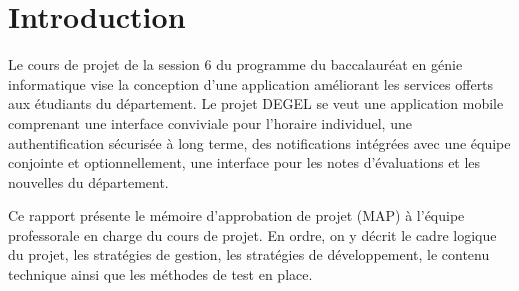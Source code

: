 \section{Introduction}
Le cours de projet de la session 6 du programme du baccalauréat en génie informatique vise la conception d'une application améliorant les services offerts aux étudiants du département. Le projet DEGEL se veut une application mobile comprenant une interface conviviale pour l'horaire individuel, une authentification sécurisée à long terme, des notifications intégrées avec une équipe conjointe et optionnellement, une interface pour les notes d'évaluations et les nouvelles du département.

Ce rapport présente le mémoire d'approbation de projet (MAP) à l'équipe professorale en charge du cours de projet. En ordre, on y décrit le cadre logique du projet, les stratégies de gestion, les stratégies de développement, le contenu technique ainsi que les méthodes de test en place.